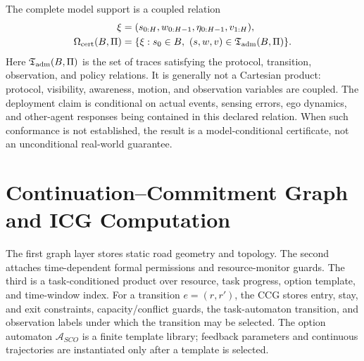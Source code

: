 \documentclass[letterpaper]{article} %
\begin{document}
The complete model support is a coupled relation
\begin{equation}
\begin{aligned}
\xi&=(s_{0:H},w_{0:H-1},\eta_{0:H-1},v_{1:H}),\\
\Omega_{\rm cert}(B,\Pi)&=
\{\xi:s_0\in B,\ 
(s,w,v)\in\mathfrak T_{\rm adm}(B,\Pi)\}.
\end{aligned}
\label{eq:cert-support}
\end{equation}
Here $\mathfrak T_{\rm adm}(B,\Pi)$ is the set of traces satisfying the protocol, transition, observation, and policy relations. It is generally not a Cartesian product: protocol, visibility, awareness, motion, and observation variables are coupled. The deployment claim is conditional on actual events, sensing errors, ego dynamics, and other-agent responses being contained in this declared relation. When such conformance is not established, the result is a model-conditional certificate, not an unconditional real-world guarantee.
\section{Continuation--Commitment Graph and ICG Computation}
\label{app:ccg}
The first graph layer stores static road geometry and topology. The second attaches time-dependent formal permissions and resource-monitor guards. The third is a task-conditioned product over resource, task progress, option template, and time-window index. For a transition $e=(r,r')$, the CCG stores entry, stay, and exit constraints, capacity/conflict guards, the task-automaton transition, and observation labels under which the transition may be selected. The option automaton $\mathcal A_{SCO}$ is a finite template library; feedback parameters and continuous trajectories are instantiated only after a template is selected.
\end{document}
